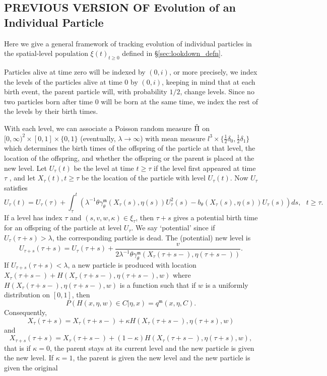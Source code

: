 \documentclass[12pt]{article}
\begin{document}
\subsection{PREVIOUS VERSION OF Evolution of an Individual Particle}
\label{sec: Evolution of an Individual Particle}

Here we give a general framework of tracking evolution
of individual particles in the spatial-level population $\xi(t)_{t \geq 0}$ defined in \S \ref{sec:lookdown_defn}.

Particles alive at time zero will be indexed by $(0, i)$,
or more precisely,
we index the levels of the particles
alive at time $0$ by $(0, i)$,
keeping in mind that at each birth event,
the parent particle will,
with probability $1/2$, change levels.
Since no two particles born after time $0$
will be born at the same time,
we index the rest of the levels by their birth times.

With each level,
we can associate a Poisson random measure
$\Tilde{\Pi}$ on $[0, \infty)^2\times [0,1]\times \{0,1\}$ (eventually, $\lambda \to \infty$) with mean measure $l^3 \times \{\frac{1}{2}\delta_0,\frac{1}{2}\delta_1\}$ which
determines the birth times of the offspring of the particle at that level, the location of the
offspring, and whether the offspring or the parent is placed at the new level. Let $U_{\tau}(t)$ be
the level at time $t \geq \tau$ if the level first appeared at time $\tau$ , and let $X_{\tau}(t), t \geq \tau$ be the
location of the particle with level $U_{\tau}(t)$. 
Now $U_{\tau}$ satisfies
\begin{equation}
U_{\tau}(t)=U_{\tau}(\tau)+\int_{\tau}^{t}(\lambda^{-1} \theta \gamma^{\mathfrak{m}}_{\theta}(X_{\tau}(s),\eta(s))U^2_{\tau}(s)-b_{\theta}(X_{\tau}(s),\eta(s))U_{\tau}(s))ds, ~~~ t \geq \tau.    
\end{equation}
If a level has index $\tau$ and $(s,v,w,\kappa)\in \xi_\tau$, then $\tau+s$ gives a potential birth time for an offspring of the particle at level $U_{\tau}$. We say `potential' since if $U_{\tau}(\tau+s)>\lambda$, the corresponding particle is dead. The (potential) new level is 
\begin{equation}\label{New birth potential level}
    U_{\tau+s}(\tau+s)=U_{\tau}(\tau+s)+ \frac{v}{2\lambda^{-1} \theta \gamma^{\mathfrak{m}}_{\theta}(X_{\tau}(\tau+s-), \eta(\tau+s-))}.
\end{equation}
If $U_{\tau+s}(\tau+s)< \lambda$, a new particle is produced with location $X_{\tau}(\tau+s-)+H(X_{\tau}(\tau+s-), \eta(\tau+s-),w)$ where $H(X_{\tau}(\tau+s-), \eta(\tau+s-),w)$ is a function such that if $w$ is a uniformly distribution on $[0,1]$, then 
\begin{equation}\label{eq: Individual Evolution Jump Kernel}
P(H(x, \eta,w)\in C | \eta,x)=q^{\mathfrak{m}}(x, \eta,C).    
\end{equation}
Consequently, 
$$X_{\tau}(\tau+s)=X_{\tau}(\tau+s-)+\kappa H(X_{\tau}(\tau+s-), \eta(\tau+s),w)$$
and 
$$X_{\tau+s}(\tau+s)=X_{\tau}(\tau+s-)+(1-\kappa) H(X_{\tau}(\tau+s-), \eta(\tau+s),w),$$
that is if $\kappa=0$, the parent stays at its current level and the new particle is given the new
level. If $\kappa = 1 $, the parent is given the new level and the new particle is given the original
\end{document}
